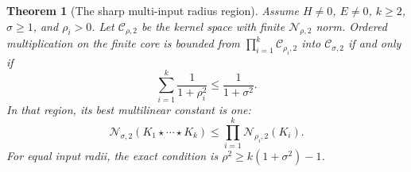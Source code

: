 \documentclass[11pt,a4paper]{amsart}
\numberwithin{equation}{section}
\newtheorem{theorem}{Theorem}[section]
\theoremstyle{definition}
\theoremstyle{remark}
\begin{document}
\begin{theorem}[The sharp multi-input radius region]\label{thm:arity}
Assume $H\ne0$, $E\ne0$, $k\ge2$, $\sigma\ge1$, and $\rho_i>0$. Let $\mathcal C_{\rho,2}$ be the kernel space with finite $\mathcal N_{\rho,2}$ norm. Ordered multiplication on the finite core is bounded from $\prod_{i=1}^k\mathcal C_{\rho_i,2}$ into $\mathcal C_{\sigma,2}$ if and only if
\begin{equation}\label{eq:arityregion}
 \sum_{i=1}^k\frac1{1+\rho_i^2}\le\frac1{1+\sigma^2}.
\end{equation}
In that region, its best multilinear constant is one:
\begin{equation}\label{eq:aritybound}
 \mathcal N_{\sigma,2}(K_1\star\cdots\star K_k)
 \le\prod_{i=1}^k\mathcal N_{\rho_i,2}(K_i).
\end{equation}
For equal input radii, the exact condition is $\rho^2\ge k(1+\sigma^2)-1$.
\end{theorem}
\end{document}
